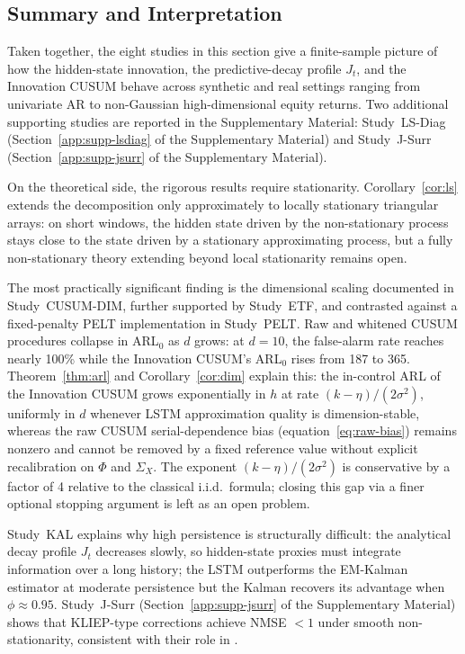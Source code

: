 \documentclass[bj,authoryear]{imsart}
\theoremstyle{plain}
\theoremstyle{definition}
\begin{document}
\subsection{Summary and Interpretation}
\label{sec:discussion}

Taken together, the eight studies in this section give a finite-sample picture
of how the hidden-state innovation, the predictive-decay profile $J_t$, and
the Innovation CUSUM behave across synthetic and real settings ranging from univariate AR
to non-Gaussian high-dimensional equity returns.
Two additional supporting studies are reported in the Supplementary Material:
Study~LS-Diag (Section~\ref{app:supp-lsdiag} of the Supplementary Material) and Study~J-Surr (Section~\ref{app:supp-jsurr} of the Supplementary Material).

On the theoretical side, the rigorous results require stationarity.
Corollary~\ref{cor:ls} extends the decomposition only approximately to locally
stationary triangular arrays: on short windows, the hidden state driven by the
non-stationary process stays close to the state driven by a stationary
approximating process, but a fully non-stationary theory extending beyond local
stationarity remains open.

The most practically significant finding is the dimensional scaling documented
in Study~CUSUM-DIM, further supported by Study~ETF,
and contrasted against a fixed-penalty PELT implementation in Study~PELT.
Raw and whitened CUSUM procedures collapse in
ARL$_0$ as $d$ grows: at $d=10$, the false-alarm rate reaches nearly 100\%
while the Innovation CUSUM's ARL$_0$ rises from 187 to 365.
Theorem~\ref{thm:arl} and Corollary~\ref{cor:dim} explain this: the
in-control ARL of the Innovation CUSUM grows exponentially in $h$ at rate
$(k-\eta)/(2\sigma^2)$, uniformly in $d$ whenever LSTM approximation quality
is dimension-stable, whereas the raw CUSUM serial-dependence bias
(equation~\eqref{eq:raw-bias}) remains nonzero and cannot be removed by
a fixed reference value without explicit recalibration on $\Phi$ and $\Sigma_X$.
The exponent $(k-\eta)/(2\sigma^2)$ is conservative by a factor of 4 relative
to the classical i.i.d.\ formula; closing this gap via a finer optional
stopping argument is left as an open problem.

Study~KAL explains why high persistence is structurally difficult: the
analytical decay profile $J_t$ decreases slowly, so hidden-state proxies
must integrate information over a long history; the LSTM outperforms the
EM-Kalman estimator at moderate persistence but the Kalman recovers its
advantage when $\phi \approx 0.95$.  Study~J-Surr (Section~\ref{app:supp-jsurr} of the Supplementary Material) shows that KLIEP-type corrections achieve NMSE $< 1$ under
smooth non-stationarity, consistent with their role in \citet{chang2026jrssb}.
\end{document}
